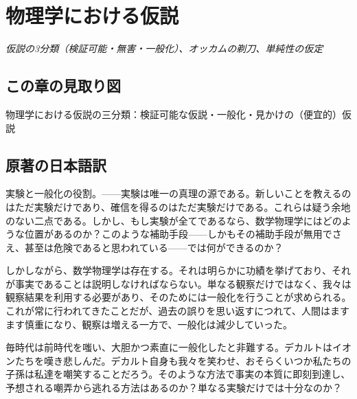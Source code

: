 \documentclass[a4paper,11pt,openany]{ltjsbook}
\begin{document}
\clearpage
\chapter{物理学における仮説}
\begin{center}\large\textit{仮説の3分類（検証可能・無害・一般化）、オッカムの剃刀、単純性の仮定}\end{center}

\section*{この章の見取り図}
\begin{center}


\small 物理学における仮説の三分類：検証可能な仮説・一般化・見かけの（便宜的）仮説
\end{center}

\section{原著の日本語訳}
実験と一般化の役割。——実験は唯一の真理の源である。新しいことを教えるのはただ実験だけであり、確信を得るのはただ実験だけである。これらは疑う余地のない二点である。しかし、もし実験が全てであるなら、数学物理学にはどのような位置があるのか？このような補助手段——しかもその補助手段が無用でさえ、甚至は危険であると思われている——では何ができるのか？

しかしながら、数学物理学は存在する。それは明らかに功績を挙げており、それが事実であることは説明しなければならない。単なる観察だけではなく、我々は観察結果を利用する必要があり、そのためには一般化を行うことが求められる。これが常に行われてきたことだが、過去の誤りを思い返すにつれて、人間はますます慎重になり、観察は増える一方で、一般化は減少していった。

毎時代は前時代を嗤い、大胆かつ素直に一般化したと非難する。デカルトはイオンたちを嘆き悲しんだ。デカルト自身も我々を笑わせ、おそらくいつか私たちの子孫は私達を嘲笑することだろう。そのような方法で事実の本質に即刻到達し、予想される嘲弄から逃れる方法はあるのか？単なる実験だけでは十分なのか？
\end{document}
